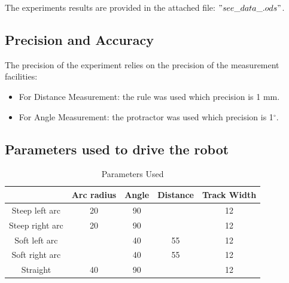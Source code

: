 \documentclass[10pt]{scrartcl}
\begin{document}
The experiments results are provided in the attached file: $"see\_data\_.ods"$.

\subsection*{Precision and Accuracy}

The precision of the experiment relies on the precision of the measurement facilities:
\begin{itemize}
	\item For Distance Measurement: the rule was used which precision is 1 mm.
	\item For Angle Measurement: the protractor was used which precision is 1$^{\circ}$.
\end{itemize}

\newpage
\subsection*{Parameters used to drive the robot}

\begin{table}[ht!]
\centering
\caption{Parameters Used}
\label{params}
\begin{tabular}{|c|c|c|c|c|} \hline
 				& Arc radius& Angle & Distance & Track Width \\ \hline
Steep left arc  & 20        & 90    &          & 12 \\ \hline
Steep right arc & 20        & 90    &          & 12 \\ \hline
Soft left arc   &           & 40    & 55       & 12 \\ \hline
Soft right arc  &           & 40    & 55       & 12 \\ \hline
Straight        & 40        & 90    &          & 12 \\ \hline
 
\end{tabular}
\end{table}

	
\end{document}
